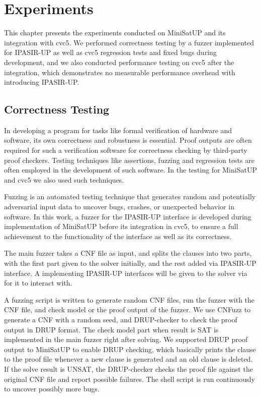 \chapter{Experiments}

This chapter presents the experiments conducted on MiniSatUP and its integration with cvc5. We performed correctness testing by a fuzzer implemented for IPASIR-UP as well as cvc5 regression tests and fixed bugs during development, and we also conducted performance testing on cvc5 after the integration, which demonstrates no measurable performance overhead with introducing IPASIR-UP.

\section{Correctness Testing}

In developing a program for tasks like formal verification of hardware and software, its own correctness and robustness is essential. Proof outputs are often required for such a verification software for correctness checking by third-party proof checkers. Testing techniques like assertions, fuzzing and regression tests are often employed in the development of such software. In the testing for MiniSatUP and cvc5 we also used such techniques.

Fuzzing is an automated testing technique that generates random and potentially adversarial input data to uncover bugs, crashes, or unexpected behavior in software. In this work, a fuzzer for the IPASIR-UP interface is developed during implementation of MiniSatUP before its integration in cvc5, to ensure a full achievement to the functionality of the interface as well as its correctness.

The main fuzzer takes a CNF file as input, and splits the clauses into two parts, with the first part given to the solver initially, and the rest added via IPASIR-UP interface. A  implementing IPASIR-UP interfaces will be given to the solver via  for it to interact with.

A fuzzing script is written to generate random CNF files, run the fuzzer with the CNF file, and check model or the proof output of the fuzzer. We use CNFuzz \cite{BrummayerLonsingBiere-SAT10} to generate a CNF with a random seed, and DRUP-checker \cite{6679408} to check the proof output in DRUP format. The check model part when result is SAT is implemented in the main fuzzer right after solving. We supported DRUP proof output to MiniSatUP to enable DRUP checking, which basically prints the clause to the proof file whenever a new clause is generated and an old clause is deleted. If the solve result is UNSAT, the DRUP-checker checks the proof file against the original CNF file and report possible failures. The shell script is run continuously to uncover possibly more bugs.

